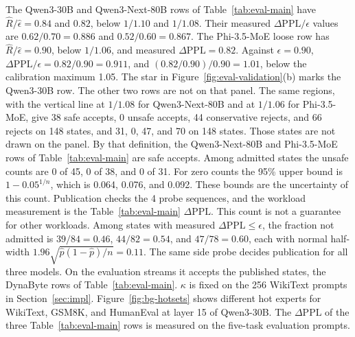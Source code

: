 The Qwen3-30B and Qwen3-Next-80B rows of Table~\ref{tab:eval-main} have \(\widehat R/\widehat\epsilon=0.84\) and \(0.82\), below \(1/1.10\) and \(1/1.08\). Their measured \(\Delta\mathrm{PPL}/\epsilon\) values are \(0.62/0.70=0.886\) and \(0.52/0.60=0.867\). The Phi-3.5-MoE loose row has \(\widehat R/\widehat\epsilon=0.90\), below \(1/1.06\), and measured \(\Delta\mathrm{PPL}=0.82\). Against \(\epsilon=0.90\), \(\Delta\mathrm{PPL}/\epsilon=0.82/0.90=0.911\), and \((0.82/0.90)/0.90=1.01\), below the calibration maximum 1.05. The star in Figure~\ref{fig:eval-validation}(b) marks the Qwen3-30B row. The other two rows are not on that panel. The same regions, with the vertical line at \(1/1.08\) for Qwen3-Next-80B and at \(1/1.06\) for Phi-3.5-MoE, give 38 safe accepts, 0 unsafe accepts, 44 conservative rejects, and 66 rejects on 148 states, and 31, 0, 47, and 70 on 148 states. Those states are not drawn on the panel. By that definition, the Qwen3-Next-80B and Phi-3.5-MoE rows of Table~\ref{tab:eval-main} are safe accepts. Among admitted states the unsafe counts are 0 of 45, 0 of 38, and 0 of 31. For zero counts the 95\% upper bound is \(1-0.05^{1/n}\), which is 0.064, 0.076, and 0.092. These bounds are the uncertainty of this count. Publication checks the 4 probe sequences, and the workload measurement is the Table~\ref{tab:eval-main} \(\Delta\mathrm{PPL}\). This count is not a guarantee for other workloads. Among states with measured \(\Delta\mathrm{PPL}\le\epsilon\), the fraction not admitted is \(39/84=0.46\), \(44/82=0.54\), and \(47/78=0.60\), each with normal half-width \(1.96\sqrt{\hat p(1-\hat p)/n}=0.11\). The same side probe decides publication for all three models. On the evaluation streams it accepts the published states, the DynaByte rows of Table~\ref{tab:eval-main}. \(\kappa\) is fixed on the 256 WikiText prompts in Section~\ref{sec:impl}. Figure~\ref{fig:bg-hotsets} shows different hot experts for WikiText, GSM8K, and HumanEval at layer 15 of Qwen3-30B. The \(\Delta\mathrm{PPL}\) of the three Table~\ref{tab:eval-main} rows is measured on the five-task evaluation prompts.

